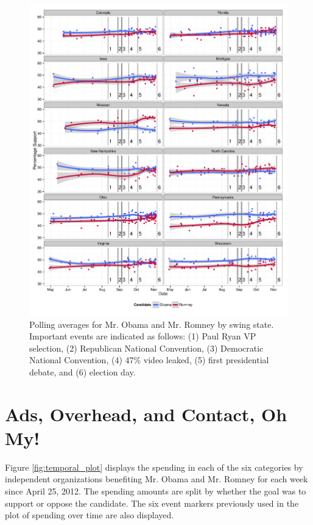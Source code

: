 \documentclass[11pt]{article}\usepackage{graphicx, color}
\newenvironment{knitrout}{}{} %
\begin{document}
\begin{knitrout}
\color{fgcolor}\begin{figure}[H]


{\centering \includegraphics[width=\textwidth]{figure/type_swing_1} 

}

\caption[Polling averages for Mr]{Polling averages for Mr. Obama and Mr. Romney by swing state. Important events are indicated as follows: (1) Paul Ryan VP selection, (2) Republican National Convention, (3) Democratic National Convention, (4) 47\% video leaked, (5) first presidential debate, and (6) election day.\label{fig:type_swing_1}}
\end{figure}


\end{knitrout}



\section{Ads, Overhead, and Contact, Oh My!}
Figure \ref{fig:temporal_plot} displays the spending in each of the six categories by independent organizations benefiting Mr. Obama and Mr. Romney for each week since April 25, 2012. The spending amounts are split by whether the goal was to support or oppose the candidate. The six event markers previously used in the plot of spending over time are also displayed.
\end{document}
